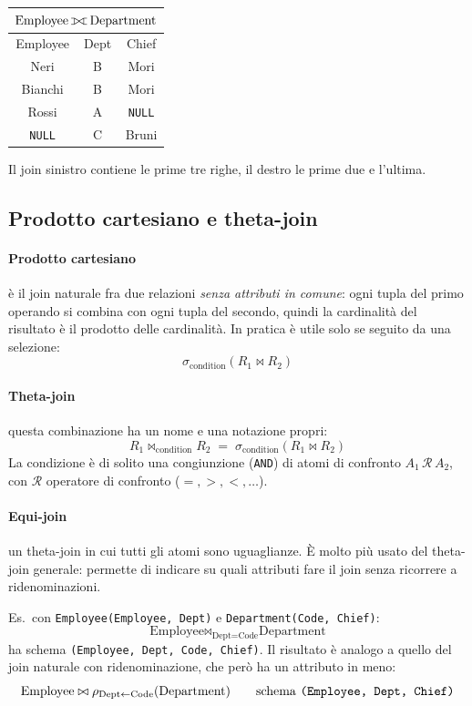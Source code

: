 \documentclass[a4paper,12pt]{article}
\newcommand{\ojoin}{\setbox0=\hbox{$\bowtie$}%
  \rule[-.02ex]{.25em}{.4pt}\llap{\rule[\ht0]{.25em}{.4pt}}}
\newcommand{\fullouterjoin}{\mathbin{\ojoin\mkern-5.8mu\bowtie\mkern-5.8mu\ojoin}}
\begin{document}
\begin{center}
\begin{tabular}{ccc}
\multicolumn{3}{c}{$\text{Employee} \fullouterjoin \text{Department}$}\\ \hline
Employee & Dept & Chief\\ \hline
Neri & B & Mori\\
Bianchi & B & Mori\\
Rossi & A & \texttt{NULL}\\
\texttt{NULL} & C & Bruni\\ \hline
\end{tabular}
\end{center}
Il join sinistro contiene le prime tre righe, il destro le prime due e
l'ultima.

\subsection{Prodotto cartesiano e theta-join}

\paragraph{Prodotto cartesiano} è il join naturale fra due relazioni
\emph{senza attributi in comune}: ogni tupla del primo operando si combina con
ogni tupla del secondo, quindi la cardinalità del risultato è il prodotto delle
cardinalità. In pratica è utile solo se seguito da una selezione:
\[
  \sigma_{\text{condition}}(R_1 \bowtie R_2)
\]

\paragraph{Theta-join} questa combinazione ha un nome e una notazione propri:
\[
  R_1 \bowtie_{\text{condition}} R_2 \;=\;
  \sigma_{\text{condition}}(R_1 \bowtie R_2)
\]
La condizione è di solito una congiunzione (\texttt{AND}) di atomi di
confronto $A_1 \,\mathcal{R}\, A_2$, con $\mathcal{R}$ operatore di confronto
($=, >, <, \ldots$).

\paragraph{Equi-join} un theta-join in cui tutti gli atomi sono uguaglianze. È
molto più usato del theta-join generale: permette di indicare su quali
attributi fare il join senza ricorrere a ridenominazioni.

Es.\ con \texttt{Employee(Employee, Dept)} e \texttt{Department(Code, Chief)}:
\[
  \text{Employee} \bowtie_{\text{Dept} = \text{Code}} \text{Department}
\]
ha schema \texttt{(Employee, Dept, Code, Chief)}. Il risultato è analogo a
quello del join naturale con ridenominazione, che però ha un attributo in meno:
\[
  \text{Employee} \bowtie \rho_{\text{Dept} \leftarrow \text{Code}}
    (\text{Department})
  \qquad \text{schema \texttt{(Employee, Dept, Chief)}}
\]
\end{document}
